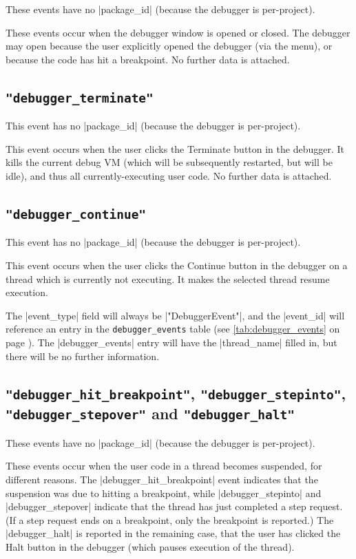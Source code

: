 \documentclass{report}
\newcommand{\myref}[1]{\autoref{#1} on page \pageref*{#1}}
\newcommand{\tabref}[1]{\lstinline|#1| table (see \myref{tab:#1})}
\begin{document}
These events have no |package_id| (because the debugger is per-project).

These events occur when the debugger window is opened or closed.  The debugger
may open because the user explicitly opened the debugger (via the menu), or
because the code has hit a breakpoint.  No further data is attached.

\subsection{\lstinline!"debugger_terminate"!}
\label{evt:debugger_terminate}

This event has no |package_id| (because the debugger is per-project).

This event occurs when the user clicks the Terminate button in the debugger.
It kills the current debug VM (which will be subsequently restarted, but will
be idle), and thus all currently-executing user code.  No
further data is attached.

\subsection{\lstinline!"debugger_continue"!}
\label{evt:debugger_continue}

This event has no |package_id| (because the debugger is per-project).

This event occurs when the user clicks the Continue button in the debugger on
a thread which is currently not executing.
It makes the selected thread resume execution.  

The |event_type| field will always be |"DebuggerEvent"|, and the |event_id| will
reference an entry in the \tabref{debugger_events}.  The |debugger_events|
entry will have the |thread_name| filled in, but there will be no further information.

\subsection{\lstinline!"debugger_hit_breakpoint"!, \lstinline!"debugger_stepinto"!,\\ \lstinline!"debugger_stepover"! and \lstinline!"debugger_halt"!}
\label{evt:debugger_hit_breakpoint}
\label{evt:debugger_stepinto}
\label{evt:debugger_stepover}
\label{evt:debugger_halt}

These events have no |package_id| (because the debugger is per-project).

These events occur when the user code in a thread becomes suspended, for
different reasons.  The
|debugger_hit_breakpoint| event indicates that the suspension was due to
hitting a breakpoint, while |debugger_stepinto| and |debugger_stepover|
indicate that the thread has just completed a step request.  (If a step
request ends on a breakpoint, only the breakpoint is reported.)  The
|debugger_halt| is reported in the remaining case, that the user has
clicked the Halt button in the debugger (which pauses execution of the thread).
\end{document}
